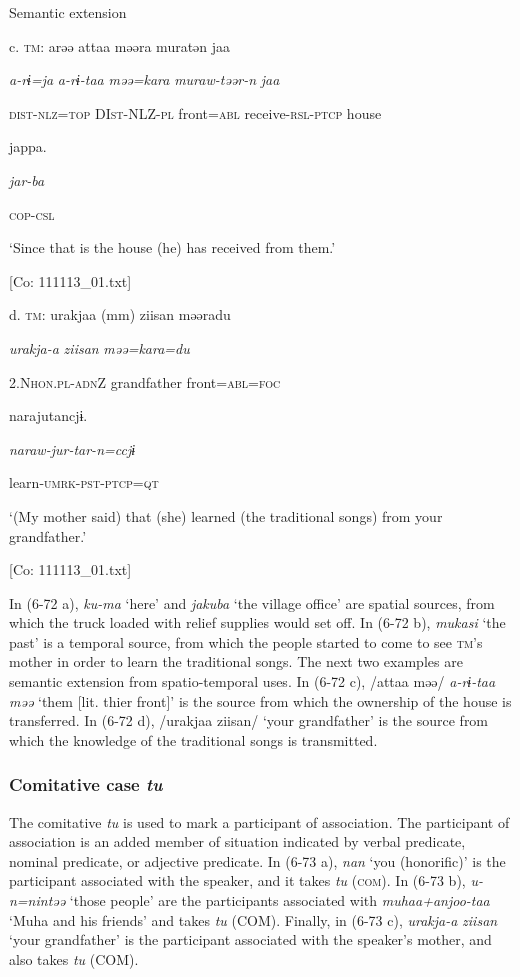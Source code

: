   Semantic extension

  c.  \textsc{tm}:  arəə  attaa  məəra  muratən  jaa

      \textit{a-rɨ=ja}  \textit{a-rɨ-taa}  \textit{məə=kara}  \textit{muraw-təər-n}  \textit{jaa}

      \textsc{dist}-\textsc{nlz}=\textsc{top}  DI\textsc{st}-NLZ-\textsc{pl}  front=\textsc{abl}  receive-\textsc{rsl}-\textsc{ptcp}  house

      jappa.

      \textit{jar-ba}

      \textsc{cop}-\textsc{csl}

      ‘Since that is the house (he) has received from them.’

      [Co: 111113\_01.txt]

  d.  \textsc{tm}:  urakjaa  (mm)  ziisan  məəradu

      \textit{urakja-a}    \textit{ziisan}  \textit{məə=kara=du}

      2.N\textsc{hon}.\textsc{pl}-\textsc{adn}Z    grandfather  front=\textsc{abl}=\textsc{foc}

      narajutancjɨ.

      \textit{naraw-jur-tar-n=ccjɨ}

      learn-\textsc{umrk}-\textsc{pst}-\textsc{ptcp}=\textsc{qt}

      ‘(My mother said) that (she) learned (the traditional songs) from your grandfather.’

      [Co: 111113\_01.txt]

In (6-72 a), \textit{ku-ma} ‘here’ and \textit{jakuba} ‘the village office’ are spatial sources, from which the truck loaded with relief supplies would set off. In (6-72 b), \textit{mukasi} ‘the past’ is a temporal source, from which the people started to come to see \textsc{tm}’s mother in order to learn the traditional songs. The next two examples are semantic extension from spatio-temporal uses. In (6-72 c), /attaa məə/ \textit{a-rɨ-taa} \textit{məə} ‘them [lit. thier front]’ is the source from which the ownership of the house is transferred. In (6-72 d), /urakjaa ziisan/ ‘your grandfather’ is the source from which the knowledge of the traditional songs is transmitted.

\subsubsection{ Comitative case \textit{tu}}

The comitative \textit{tu} is used to mark a participant of association. The participant of association is an added member of situation indicated by verbal predicate, nominal predicate, or adjective predicate. In (6-73 a), \textit{nan} ‘you (honorific)’ is the participant associated with the speaker, and it takes \textit{tu} (\textsc{com}). In (6-73 b), \textit{u-n=nintəə} ‘those people’ are the participants associated with \textit{muhaa+anjoo-taa} ‘Muha and his friends’ and takes \textit{tu} (COM). Finally, in (6-73 c), \textit{urakja-a} \textit{ziisan} ‘your grandfather’ is the participant associated with the speaker’s mother, and also takes \textit{tu} (COM).

